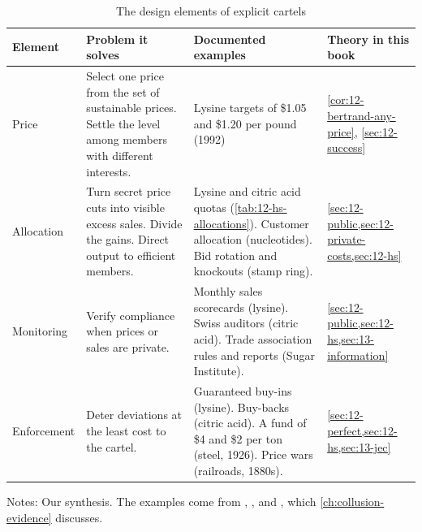 \begin{table}[htbp]
\centering
\caption{The design elements of explicit cartels}
\label{tab:12-cartel-elements}
\small
\begin{threeparttable}
\begin{tabularx}{\textwidth}{@{}>{\raggedright\arraybackslash}p{2.0cm}
  >{\raggedright\arraybackslash}X >{\raggedright\arraybackslash}X >{\raggedright\arraybackslash}p{2.9cm}@{}}
\toprule
Element & Problem it solves & Documented examples & Theory in this book \\
\midrule
Price & Select one price from the set of sustainable prices. Settle the level among members with different
interests. & Lysine targets of \$1.05 and \$1.20 per pound (1992) & \cref{cor:12-bertrand-any-price},
\cref{sec:12-success} \\
\addlinespace
Allocation & Turn secret price cuts into visible excess sales. Divide the gains. Direct output to efficient
members. & Lysine and citric acid quotas (\cref{tab:12-hs-allocations}). Customer allocation (nucleotides). Bid
rotation and knockouts (stamp ring). & \cref{sec:12-public,sec:12-private-costs,sec:12-hs} \\
\addlinespace
Monitoring & Verify compliance when prices or sales are private. & Monthly sales scorecards (lysine). Swiss
auditors (citric acid). Trade association rules and reports (Sugar Institute). &
\cref{sec:12-public,sec:12-hs,sec:13-information} \\
\addlinespace
Enforcement & Deter deviations at the least cost to the cartel. & Guaranteed buy-ins (lysine). Buy-backs (citric
acid). A fund of \$4 and \$2 per ton (steel, 1926). Price wars (railroads, 1880s). &
\cref{sec:12-perfect,sec:12-hs,sec:13-jec} \\
\bottomrule
\end{tabularx}
\begin{tablenotes}\footnotesize
\item Notes: Our synthesis. The examples come from \citet{HarringtonSkrzypacz2011}, \citet{GenesoveMullin2001},
\citet{BernheimMadsen2017} and \citet{Asker2010}, which \cref{ch:collusion-evidence} discusses.
\end{tablenotes}
\end{threeparttable}
\end{table}

